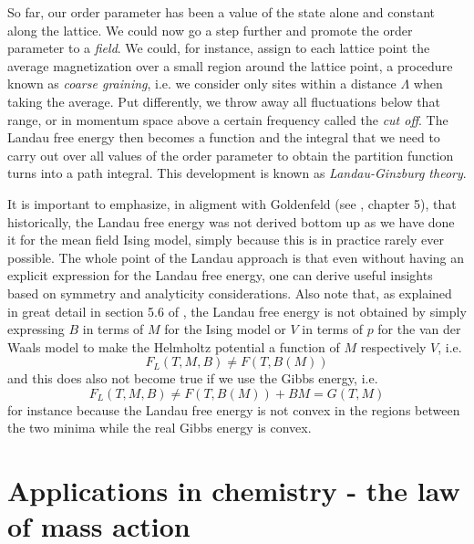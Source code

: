 \documentclass[a4paper, draft]{article}
\theoremstyle{own}
\theoremstyle{remark}
\begin{document}
So far, our order parameter has been a value of the state alone and constant along the lattice. We could now go a step further and promote the order parameter to a {\em field}. We could, for instance, assign to each lattice point the average magnetization over a small region around the lattice point, a procedure known as {\em coarse graining}, i.e. we consider only sites within a distance $\Lambda$ when taking the average. Put differently, we throw away all fluctuations below that range, or in momentum space above a certain frequency called the {\em cut off}. The Landau free energy then becomes a function and the integral that we need to carry out over all values of the order parameter to obtain the partition function turns into a path integral. This development is known as {\em Landau-Ginzburg theory}.

It is important to emphasize, in aligment with Goldenfeld (see \cite{Goldenfeld}, chapter 5), that historically, the Landau free energy was not derived bottom up as we have done it for the mean field Ising model, simply because this is in practice rarely ever possible. The whole point of the Landau approach is that even without having an explicit expression for the Landau free energy, one can derive useful insights based on symmetry and analyticity considerations. Also note that, as explained in great detail in section 5.6 of \cite{Goldenfeld}, the Landau free energy is not obtained by simply expressing $B$ in terms of $M$ for the Ising model or $V$ in terms of $p$ for the van der Waals model to make the Helmholtz potential a function of $M$ respectively $V$, i.e. 
$$
F_L(T, M, B) \neq F(T, B(M))
$$
and this does also not become true if we use the Gibbs energy, i.e.
$$
F_L(T, M, B) \neq F(T, B(M)) + BM = G(T, M)
$$
for instance because the Landau free energy is not convex in the regions between the two minima while the real Gibbs energy is convex.
 
 
\section{Applications in chemistry - the law of mass action}
\end{document}
